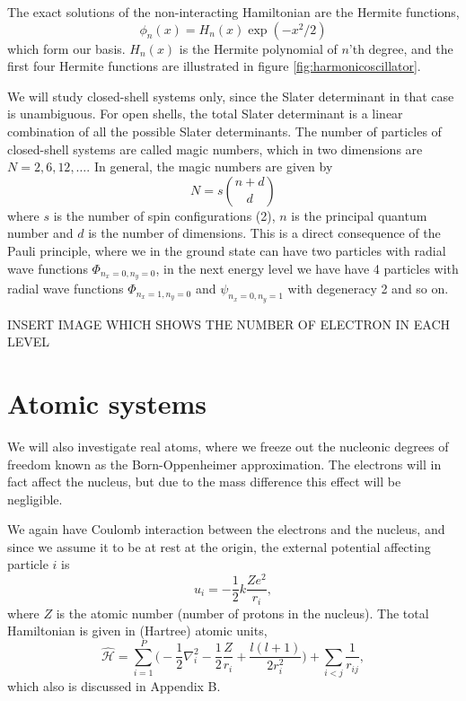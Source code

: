 The exact solutions of the non-interacting Hamiltonian are the Hermite functions, 
\begin{equation}
\phi_n(x)=H_n(x)\exp(-x^2/2)
\end{equation}
which form our basis. $H_n(x)$ is the Hermite polynomial of $n$'th degree, and the first four Hermite functions are illustrated in figure \eqref{fig:harmonicoscillator}.

We will study closed-shell systems only, since the Slater determinant in that case is unambiguous. For open shells, the total Slater determinant is a linear combination of all the possible Slater determinants. The number of particles of closed-shell systems are called magic numbers, which in two dimensions are $N=2,6,12,\hdots$. In general, the magic numbers are given by
\begin{equation}
N=s\binom{n+d}{d}
\end{equation}
where $s$ is the number of spin configurations (2), $n$ is the principal quantum number and $d$ is the number of dimensions. This is a direct consequence of the Pauli principle, where we in the ground state can have two particles with radial wave functions $\Phi_{n_x=0,n_y=0}$, in the next energy level we have have 4 particles with radial wave functions $\Phi_{n_x=1,n_y=0}$ and $\psi_{n_x=0,n_y=1}$ with degeneracy 2 and so on. 

INSERT IMAGE WHICH SHOWS THE NUMBER OF ELECTRON IN EACH LEVEL

\section{Atomic systems} \label{subsubsec:atomic}
We will also investigate real atoms, where we freeze out the nucleonic degrees of freedom known as the Born-Oppenheimer approximation. The electrons will in fact affect the nucleus, but due to the mass difference this effect will be negligible.

We again have Coulomb interaction between the electrons and the nucleus, and since we assume it to be at rest at the origin, the external potential affecting particle $i$ is
\begin{equation}
u_i=- \frac{1}{2} k\frac{Ze^2}{r_i},
\end{equation}
where $Z$ is the atomic number (number of protons in the nucleus). The total Hamiltonian is given in (Hartree) atomic units, 
\begin{equation}
\label{eq:AtomicHamiltonian}
\hat{\mathcal{H}} = \sum_{i=1}^{P} \Big(-\frac{1}{2} \nabla_i^2 - \frac{1}{2} \frac{Z}{r_i}+\frac{l(l+1)}{2r_i^2}\Big) + \sum_{i<j} \frac{1}{r_{ij}},
\end{equation}
which also is discussed in Appendix B. 


